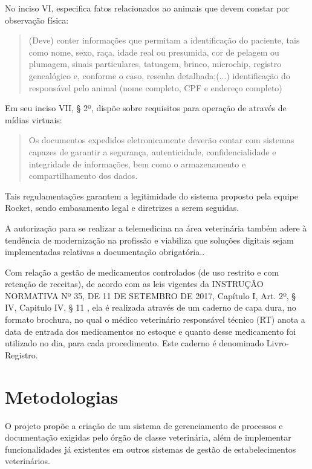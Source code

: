 \documentclass[
    12pt,               %
    openright,          %
    oneside,
    a4paper,            %
    BIBLATEX,           %
    TODO,               %
    english,            %
    brazil              %
    ]{ifsp-spo-inf-ctds}
\begin{document}
        No inciso VI, especifica fatos relacionados ao animais que devem constar por observação física:
        
        \begin{quote}
            (Deve) conter informações que permitam a identificação do paciente, tais como nome, sexo, raça, idade real ou presumida, cor de pelagem ou plumagem, sinais particulares, tatuagem, brinco, microchip, registro genealógico e, conforme o caso, resenha detalhada;(...) identificação do responsável pelo animal (nome completo, CPF e endereço completo)
        \end{quote}
    
        Em seu inciso VII, § 2º, dispõe sobre requisitos para operação de através de mídias virtuais: 
    
        \begin{quote}
            Os documentos expedidos eletronicamente deverão contar com sistemas capazes de garantir a segurança, autenticidade, confidencialidade e integridade de informações, bem como o armazenamento e compartilhamento dos dados.
        \end{quote}
    
        Tais regulamentações garantem a legitimidade do sistema proposto pela equipe Rocket, sendo embasamento legal e diretrizes a serem seguidas.
        
        A autorização para se realizar a telemedicina na área veterinária também adere à tendência de modernização na profissão e viabiliza que soluções digitais sejam implementadas relativas a documentação obrigatória.\cite{teleMV}.
        
        Com relação a gestão de medicamentos controlados (de uso restrito e com retenção de receitas), de acordo com as leis vigentes da INSTRUÇÃO NORMATIVA Nº 35, DE 11 DE SETEMBRO DE 2017, Capítulo I, Art. 2º, § IV, Capitulo IV, § 11  \cite{normativa}, ela é realizada através de um caderno de capa dura, no formato brochura, no qual o médico veterinário responsável técnico (RT) anota a data de entrada dos medicamentos no estoque e quanto desse medicamento foi utilizado no dia, para cada procedimento. Este caderno é denominado Livro-Registro.


\chapter[Metodologias]{Metodologias}

    O projeto propõe a criação de um sistema de gerenciamento de processos e documentação exigidas pelo órgão de classe veterinária, além de implementar funcionalidades já existentes em outros sistemas de gestão de estabelecimentos veterinários. 
\end{document}
